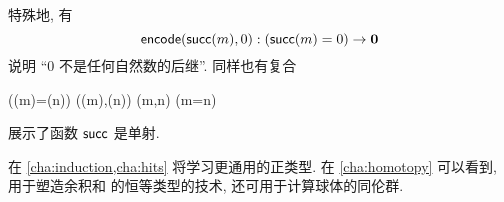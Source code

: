 特殊地, 有
\begin{equation}\label{eq:zero-not-succ}
  \encode(\suc(m),0) : (\suc(m)=0) \to \emptyt
\end{equation}
说明 ``$0$ 不是任何自然数的后继''.
同样也有复合
\begin{narrowmultline}\label{eq:suc-injective}
  (\suc(m)=\suc(n))
  \xrightarrow{\encode} \narrowbreak
  \code(\suc(m),\suc(n))
  \jdeq \code(m,n) \xrightarrow{\decode} (m=n)
\end{narrowmultline}
展示了函数 $\mathsf{succ}$ 是单射.
%

在 \cref{cha:induction,cha:hits} 将学习更通用的正类型.
在 \cref{cha:homotopy} 可以看到, 用于塑造余积和 \nat 的恒等类型的技术, 还可用于计算球体的同伦群.

%
%